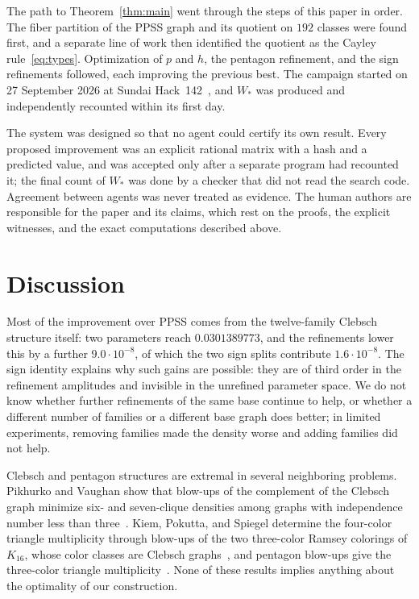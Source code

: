 \documentclass[11pt]{article}
\theoremstyle{definition}
\theoremstyle{remark}
\begin{document}
The path to Theorem~\ref{thm:main} went through the steps of this paper in order.
The fiber partition of the PPSS graph and its quotient on $192$ classes were found first, and a separate line of work then identified the quotient as the Cayley rule~\eqref{eq:types}.
Optimization of $p$ and $h$, the pentagon refinement, and the sign refinements followed, each improving the previous best.
The campaign started on 27 September 2026 at Sundai Hack~142~\cite{sundai2026}, and $W_*$ was produced and independently recounted within its first day.

The system was designed so that no agent could certify its own result.
Every proposed improvement was an explicit rational matrix with a hash and a predicted value, and was accepted only after a separate program had recounted it; the final count of $W_*$ was done by a checker that did not read the search code.
Agreement between agents was never treated as evidence.
The human authors are responsible for the paper and its claims, which rest on the proofs, the explicit witnesses, and the exact computations described above.

\section{Discussion}
\label{sec:discussion}

Most of the improvement over PPSS comes from the twelve-family Clebsch structure itself: two parameters reach $0.0301389773$, and the refinements lower this by a further $9.0\cdot10^{-8}$, of which the two sign splits contribute $1.6\cdot10^{-8}$.
The sign identity explains why such gains are possible: they are of third order in the refinement amplitudes and invisible in the unrefined parameter space.
We do not know whether further refinements of the same base continue to help, or whether a different number of families or a different base graph does better; in limited experiments, removing families made the density worse and adding families did not help.

Clebsch and pentagon structures are extremal in several neighboring problems.
Pikhurko and Vaughan show that blow-ups of the complement of the Clebsch graph minimize six- and seven-clique densities among graphs with independence number less than three~\cite{pikhurkovaughan2013}.
Kiem, Pokutta, and Spiegel determine the four-color triangle multiplicity through blow-ups of the two three-color Ramsey colorings of $K_{16}$, whose color classes are Clebsch graphs~\cite{kiem2026}, and pentagon blow-ups give the three-color triangle multiplicity~\cite{cummings2013}.
None of these results implies anything about the optimality of our construction.
\end{document}

